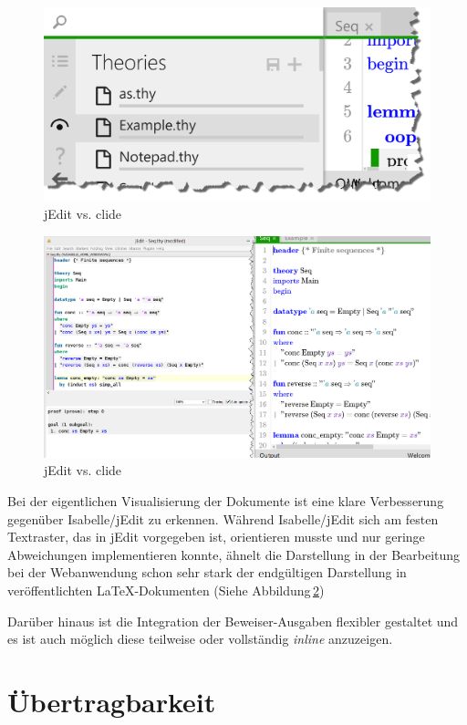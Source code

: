 \begin{figure}[ht]
\includegraphics[width=\linewidth]{images/screen-detail}
  \caption{jEdit vs. clide}
  \label{fig:screen-detail}
\end{figure}

\begin{figure}[ht]
\includegraphics[width=\linewidth]{images/jedit}
  \caption{jEdit vs. clide}
  \label{fig:jedit}
\end{figure}

Bei der eigentlichen Visualisierung der Dokumente ist eine klare Verbesserung gegenüber
Isabelle/jEdit zu erkennen. Während Isabelle/jEdit sich am festen Textraster, das in jEdit
vorgegeben ist, orientieren musste und nur geringe Abweichungen implementieren konnte, ähnelt die
Darstellung in der Bearbeitung bei der Webanwendung schon sehr stark der endgültigen Darstellung in
veröffentlichten \LaTeX-Dokumenten (Siehe Abbildung\,\ref{fig:jedit})

Darüber hinaus ist die Integration der Beweiser-Ausgaben flexibler gestaltet und es ist auch möglich
diese teilweise oder vollständig \textit{inline} anzuzeigen.

\section{Übertragbarkeit}

